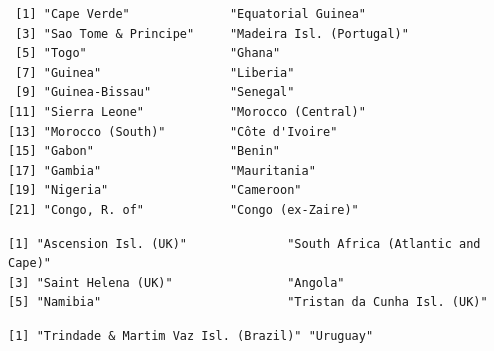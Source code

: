 \documentclass[
]{article}
\newenvironment{Shaded}{\begin{snugshade}}{\end{snugshade}}
\newcommand{\CommentTok}[1]{\textcolor[rgb]{0.37,0.37,0.37}{#1}}
\newcommand{\FunctionTok}[1]{\textcolor[rgb]{0.28,0.35,0.67}{#1}}
\newcommand{\NormalTok}[1]{\textcolor[rgb]{0.00,0.23,0.31}{#1}}
\newcommand{\SpecialCharTok}[1]{\textcolor[rgb]{0.37,0.37,0.37}{#1}}
\newcommand{\StringTok}[1]{\textcolor[rgb]{0.13,0.47,0.30}{#1}}
\begin{document}
\begin{verbatim}
 [1] "Cape Verde"              "Equatorial Guinea"      
 [3] "Sao Tome & Principe"     "Madeira Isl. (Portugal)"
 [5] "Togo"                    "Ghana"                  
 [7] "Guinea"                  "Liberia"                
 [9] "Guinea-Bissau"           "Senegal"                
[11] "Sierra Leone"            "Morocco (Central)"      
[13] "Morocco (South)"         "Côte d'Ivoire"          
[15] "Gabon"                   "Benin"                  
[17] "Gambia"                  "Mauritania"             
[19] "Nigeria"                 "Cameroon"               
[21] "Congo, R. of"            "Congo (ex-Zaire)"       
\end{verbatim}

\begin{Shaded}
\end{Shaded}

\begin{verbatim}
[1] "Ascension Isl. (UK)"              "South Africa (Atlantic and Cape)"
[3] "Saint Helena (UK)"                "Angola"                          
[5] "Namibia"                          "Tristan da Cunha Isl. (UK)"      
\end{verbatim}

\begin{Shaded}
\end{Shaded}

\begin{verbatim}
[1] "Trindade & Martim Vaz Isl. (Brazil)" "Uruguay"                            
\end{verbatim}

\begin{Shaded}
\end{Shaded}
\end{document}
